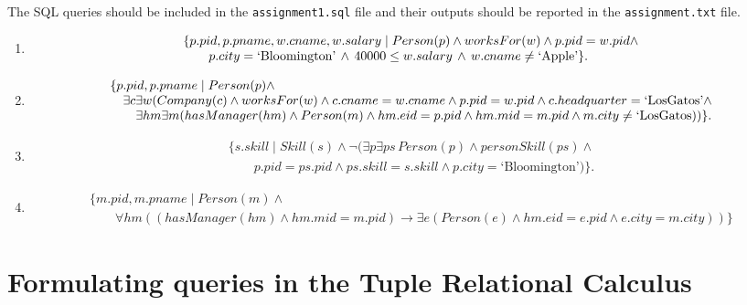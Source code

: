 \documentclass{article}
\begin{document}
The SQL queries should be included in the {\tt assignment1.sql} file and their outputs should be reported in the
{\tt assignment.txt} file.

\begin{enumerate}[resume]
\item 
{\small
\[
\begin{array}{ll}
\{p.pid, p.pname, w.cname, w.salary\mid Person(p) \land worksFor(w)\land p.pid = w.pid \land\\
\qquad p.city = \mbox{\rm `Bloomington'}\, \land\, 40000 \leq w.salary\, \land\, w.cname \neq \mbox{\rm `Apple'}\}.
\end{array}
\]
}


\item 
{\small
\[
\begin{array}{ll}
\{p.pid, p.pname\mid Person(p) \land \\
\quad \exists c \exists w (Company(c) \land worksFor(w) \land c.cname = w.cname \land p.pid = w.pid \land c.headquarter = \mbox{\rm `LosGatos'} \land \\
\quad \quad \exists hm \exists m (hasManager(hm) \land Person(m)\land 
 hm.eid = p.pid \land hm.mid = m.pid \land m.city \neq \mbox{\rm `LosGatos}))\}.
\end{array}
\]
}
\item 
{\small
\[
\begin{array}{ll}
\{s.skill\mid Skill(s) \land \lnot (\exists p\exists ps\, Person(p) \land personSkill(ps)\land  \\
\qquad p.pid = ps.pid\land ps.skill = s.skill \land p.city = \mbox{`Bloomington'})\}.
\end{array}
\]
}

\item 
{\small
\[
\begin{array}{ll}
\{m.pid, m.pname\mid Person(m) \land \\
\qquad \forall hm ((hasManager(hm)\land hm.mid = m.pid)\rightarrow 
\exists e (Person(e)\land hm.eid = e.pid \land e.city = m.city))\}
\end{array}
\]
}

\end{enumerate}
\newpage
\section{Formulating queries in the Tuple Relational Calculus}
\end{document}
